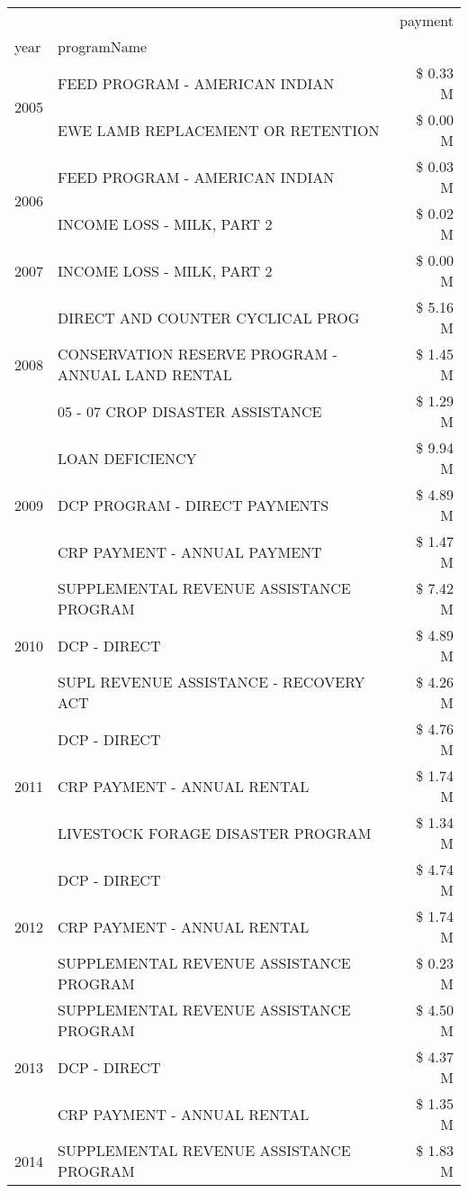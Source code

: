 \begin{tabular}{llr}
\toprule
 &  & payment \\
year & programName &  \\
\midrule
\multirow[t]{2}{*}{2005} & FEED PROGRAM - AMERICAN INDIAN & \$ 0.33 M \\
 & EWE LAMB REPLACEMENT OR RETENTION & \$ 0.00 M \\
\cline{1-3}
\multirow[t]{2}{*}{2006} & FEED PROGRAM - AMERICAN INDIAN & \$ 0.03 M \\
 & INCOME LOSS - MILK, PART 2 & \$ 0.02 M \\
\cline{1-3}
2007 & INCOME LOSS - MILK, PART 2 & \$ 0.00 M \\
\cline{1-3}
\multirow[t]{3}{*}{2008} & DIRECT AND COUNTER CYCLICAL PROG & \$ 5.16 M \\
 & CONSERVATION RESERVE PROGRAM - ANNUAL LAND RENTAL & \$ 1.45 M \\
 & 05 - 07 CROP DISASTER ASSISTANCE & \$ 1.29 M \\
\cline{1-3}
\multirow[t]{3}{*}{2009} & LOAN DEFICIENCY & \$ 9.94 M \\
 & DCP PROGRAM - DIRECT PAYMENTS & \$ 4.89 M \\
 & CRP PAYMENT - ANNUAL PAYMENT & \$ 1.47 M \\
\cline{1-3}
\multirow[t]{3}{*}{2010} & SUPPLEMENTAL REVENUE ASSISTANCE PROGRAM & \$ 7.42 M \\
 & DCP - DIRECT & \$ 4.89 M \\
 & SUPL REVENUE ASSISTANCE - RECOVERY ACT & \$ 4.26 M \\
\cline{1-3}
\multirow[t]{3}{*}{2011} & DCP - DIRECT & \$ 4.76 M \\
 & CRP PAYMENT - ANNUAL RENTAL & \$ 1.74 M \\
 & LIVESTOCK FORAGE DISASTER PROGRAM & \$ 1.34 M \\
\cline{1-3}
\multirow[t]{3}{*}{2012} & DCP - DIRECT & \$ 4.74 M \\
 & CRP PAYMENT - ANNUAL RENTAL & \$ 1.74 M \\
 & SUPPLEMENTAL REVENUE ASSISTANCE PROGRAM & \$ 0.23 M \\
\cline{1-3}
\multirow[t]{3}{*}{2013} & SUPPLEMENTAL REVENUE ASSISTANCE PROGRAM & \$ 4.50 M \\
 & DCP - DIRECT & \$ 4.37 M \\
 & CRP PAYMENT - ANNUAL RENTAL & \$ 1.35 M \\
\cline{1-3}
\multirow[t]{3}{*}{2014} & SUPPLEMENTAL REVENUE ASSISTANCE PROGRAM & \$ 1.83 M \\

\end{tabular}
